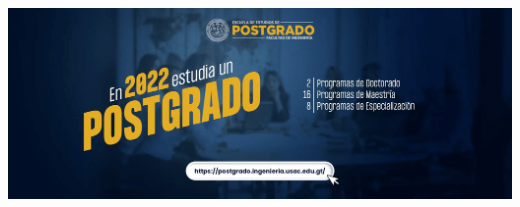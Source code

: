 \documentclass[12pt,spanish,Letterpaper,openany]{book}
\begin{document}
\begin{center}\includegraphics[width=1\linewidth]{images/publicidad14} \end{center}







\end{document}
